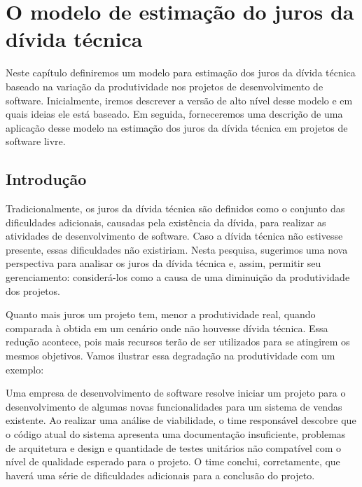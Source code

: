\chapter{O modelo de estimação do juros da dívida técnica}
\label{estimacao:juros}

Neste capítulo definiremos um modelo para estimação dos juros da dívida técnica baseado na variação da produtividade nos projetos de desenvolvimento de software. Inicialmente, iremos descrever a versão de alto nível desse modelo e em quais ideias ele está baseado. Em seguida, forneceremos uma descrição de uma aplicação desse modelo na estimação dos juros da dívida técnica em projetos de software livre.



\section{Introdução}



Tradicionalmente, os juros da dívida técnica são definidos como o conjunto das dificuldades adicionais, causadas pela existência da dívida, para realizar as atividades de desenvolvimento de software. Caso a dívida técnica não estivesse presente, essas dificuldades não existiriam. Nesta pesquisa, sugerimos uma nova perspectiva para analisar os juros da dívida técnica e, assim, permitir seu gerenciamento: considerá-los como a causa de uma diminuição da produtividade dos projetos. 

Quanto mais juros um projeto tem, menor a produtividade real, quando comparada à obtida em um cenário onde não houvesse dívida técnica. Essa redução acontece, pois mais recursos terão de ser utilizados para se atingirem os mesmos objetivos. Vamos ilustrar essa  degradação na produtividade com um exemplo: 

\begin{tcolorbox}
Uma empresa de desenvolvimento de software resolve iniciar um projeto para o desenvolvimento de algumas novas funcionalidades para um sistema de vendas existente. Ao realizar uma análise de viabilidade, o time responsável descobre que o código atual do sistema apresenta uma documentação insuficiente, problemas de arquitetura e design e quantidade de testes unitários não compatível com o nível de qualidade esperado para o projeto. O time conclui, corretamente, que haverá uma série de dificuldades adicionais para a conclusão do projeto. 
\end{tcolorbox}

